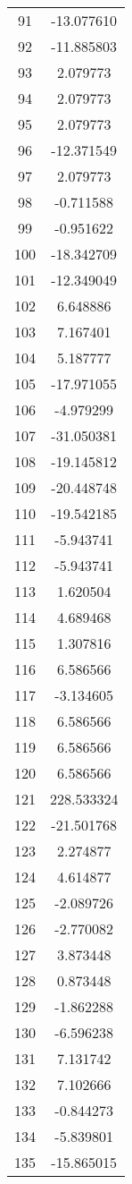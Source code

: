 \documentclass[12pt]{article}
\begin{document}
\begin{longtable}{@{}cc@{}}
91 & -13.077610 \\
92 & -11.885803 \\
93 & 2.079773 \\
94 & 2.079773 \\
95 & 2.079773 \\
96 & -12.371549 \\
97 & 2.079773 \\
98 & -0.711588 \\
99 & -0.951622 \\
100 & -18.342709 \\
101 & -12.349049 \\
102 & 6.648886 \\
103 & 7.167401 \\
104 & 5.187777 \\
105 & -17.971055 \\
106 & -4.979299 \\
107 & -31.050381 \\
108 & -19.145812 \\
109 & -20.448748 \\
110 & -19.542185 \\
111 & -5.943741 \\
112 & -5.943741 \\
113 & 1.620504 \\
114 & 4.689468 \\
115 & 1.307816 \\
116 & 6.586566 \\
117 & -3.134605 \\
118 & 6.586566 \\
119 & 6.586566 \\
120 & 6.586566 \\
121 & 228.533324 \\
122 & -21.501768 \\
123 & 2.274877 \\
124 & 4.614877 \\
125 & -2.089726 \\
126 & -2.770082 \\
127 & 3.873448 \\
128 & 0.873448 \\
129 & -1.862288 \\
130 & -6.596238 \\
131 & 7.131742 \\
132 & 7.102666 \\
133 & -0.844273 \\
134 & -5.839801 \\
135 & -15.865015 \\

\end{longtable}
\end{document}
